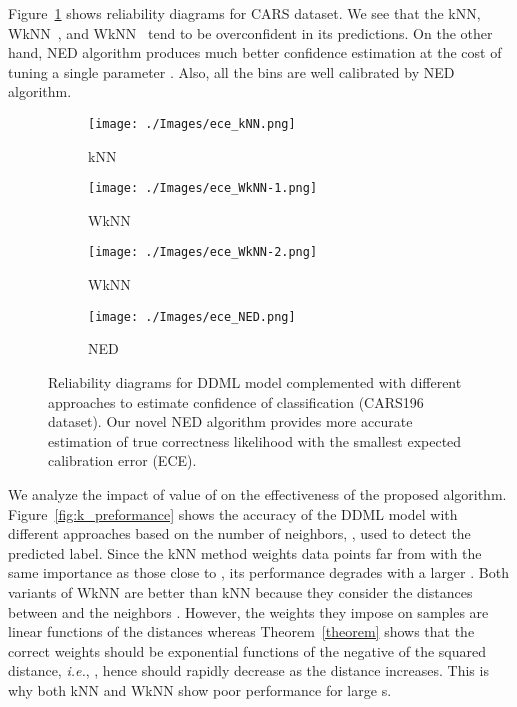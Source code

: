 \documentclass{article}
\newcommand{\ie}{{\it i.e.}}
\begin{document}
Figure~\ref{fig:reliability_diagrams} shows reliability diagrams for CARS dataset.
We see that the kNN, WkNN~\cite{b70}, and WkNN~\cite{b70} tend to be overconfident in its predictions.
On the other hand, NED algorithm produces much better confidence estimation
at the cost of tuning a single parameter .
Also, all the bins are well calibrated by NED algorithm.

\begin{figure}[th]
	\centering
	\begin{subfigure}{0.245\linewidth}
		\texttt{[image: ./Images/ece\_kNN.png]}
		\caption{kNN}
	\end{subfigure}\begin{subfigure}{0.245\linewidth}
		\texttt{[image: ./Images/ece\_WkNN-1.png]}
		\caption{WkNN~\cite{b70}}
	\end{subfigure}
	\begin{subfigure}{0.245\linewidth}
		\texttt{[image: ./Images/ece\_WkNN-2.png]}
		\caption{WkNN~\cite{b69}}
    \end{subfigure}
	\begin{subfigure}{0.245\linewidth}
		\texttt{[image: ./Images/ece\_NED.png]}
		\caption{NED}
	\end{subfigure}
	\caption{Reliability diagrams for DDML model complemented with different approaches to estimate confidence of classification (CARS196 dataset). Our novel NED algorithm provides more accurate estimation of true correctness likelihood with the smallest expected calibration error (ECE).}
	\label{fig:reliability_diagrams}
\end{figure}

We analyze the impact of value of  on the effectiveness of the proposed algorithm.
Figure~\ref{fig:k_preformance} shows the accuracy of the DDML model with different approaches based on the number of neighbors, , used to detect the predicted label. Since the kNN method weights data points far from  with the same importance as those close to , its performance degrades with a larger . Both variants of  WkNN are better than kNN because they consider the distances between  and the neighbors . However, the weights they impose on samples are linear functions of the distances
whereas Theorem~\ref{theorem} shows that the correct weights should be exponential functions of the negative of the squared distance,
\ie,
,
hence should rapidly decrease as the distance increases.
This is why both kNN and WkNN show poor performance for large s.
\end{document}

